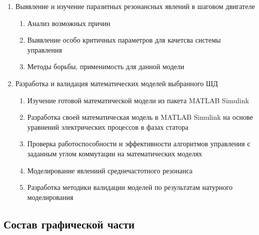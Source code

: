 \begin{enumerate}
    \item{Выявление и изучение паразитных резонансных явлений в шаговом двигателе}
        \begin{enumerate}
            \item Анализ возможных причин
            \item Выявление особо критичных параметров для качетсва системы управления
            \item Методы борьбы, применимость для данной модели
        \end{enumerate}

    \item{Разработка и валидация математических моделей выбранного ШД}
        \begin{enumerate}
            \item Изучение готовой математической модели из пакета MATLAB Simulink
            \item Разработка своей математическая модель в MATLAB Simulink на основе
                    уравнений электрических процессов в фазах статора
            \item Проверка работоспособности и эффективности алгоритмов управления с заданным углом
                    коммутации на математических моделях
            \item Моделирование явлениий среднечастотного резонанса
            \item Разработка методики валидации моделей по результатам натурного моделирования
        \end{enumerate}
\end{enumerate}

\newpage
\subsection{Состав графической части}

